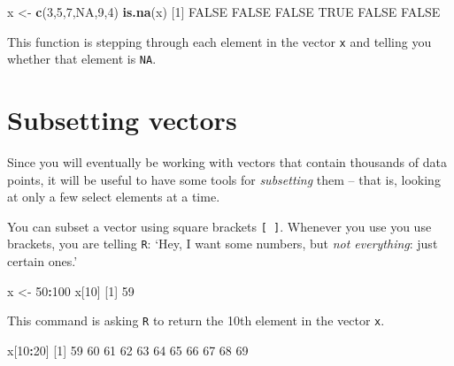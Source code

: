 \documentclass[
]{book}
\newenvironment{Shaded}{\begin{snugshade}}{\end{snugshade}}
\newcommand{\DecValTok}[1]{\textcolor[rgb]{0.00,0.00,0.81}{#1}}
\newcommand{\KeywordTok}[1]{\textcolor[rgb]{0.13,0.29,0.53}{\textbf{#1}}}
\newcommand{\NormalTok}[1]{#1}
\newcommand{\OperatorTok}[1]{\textcolor[rgb]{0.81,0.36,0.00}{\textbf{#1}}}
\newcommand{\OtherTok}[1]{\textcolor[rgb]{0.56,0.35,0.01}{#1}}
\newcommand{\StringTok}[1]{\textcolor[rgb]{0.31,0.60,0.02}{#1}}
\begin{document}
\begin{Shaded}
\begin{Highlighting}[]
\NormalTok{x <-}\StringTok{ }\KeywordTok{c}\NormalTok{(}\DecValTok{3}\NormalTok{,}\DecValTok{5}\NormalTok{,}\DecValTok{7}\NormalTok{,}\OtherTok{NA}\NormalTok{,}\DecValTok{9}\NormalTok{,}\DecValTok{4}\NormalTok{)}
\KeywordTok{is.na}\NormalTok{(x)}
\NormalTok{[}\DecValTok{1}\NormalTok{] }\OtherTok{FALSE} \OtherTok{FALSE} \OtherTok{FALSE}  \OtherTok{TRUE} \OtherTok{FALSE} \OtherTok{FALSE}
\end{Highlighting}
\end{Shaded}

This function is stepping through each element in the vector \texttt{x} and telling you whether that element is \texttt{NA}.

\hypertarget{subsetting-vectors}{%
\section*{Subsetting vectors}\label{subsetting-vectors}}

Since you will eventually be working with vectors that contain thousands of data points, it will be useful to have some tools for \emph{subsetting} them -- that is, looking at only a few select elements at a time.

You can subset a vector using square brackets \texttt{{[}\ {]}}. Whenever you use you use brackets, you are telling \texttt{R}: `Hey, I want some numbers, but \emph{not everything}: just certain ones.'

\begin{Shaded}
\begin{Highlighting}[]
\NormalTok{x <-}\StringTok{ }\DecValTok{50}\OperatorTok{:}\DecValTok{100}
\NormalTok{x[}\DecValTok{10}\NormalTok{]}
\NormalTok{[}\DecValTok{1}\NormalTok{] }\DecValTok{59}
\end{Highlighting}
\end{Shaded}

This command is asking \texttt{R} to return the 10th element in the vector \texttt{x}.

\begin{Shaded}
\begin{Highlighting}[]
\NormalTok{x[}\DecValTok{10}\OperatorTok{:}\DecValTok{20}\NormalTok{]}
\NormalTok{ [}\DecValTok{1}\NormalTok{] }\DecValTok{59} \DecValTok{60} \DecValTok{61} \DecValTok{62} \DecValTok{63} \DecValTok{64} \DecValTok{65} \DecValTok{66} \DecValTok{67} \DecValTok{68} \DecValTok{69}
\end{Highlighting}
\end{Shaded}
\end{document}
